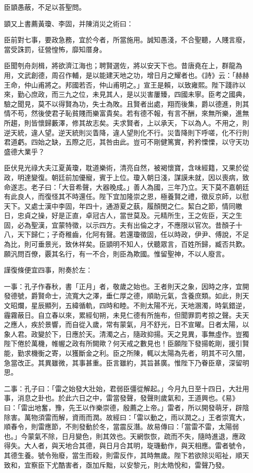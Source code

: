 \begin{pinyinscope}
臣顗愚蔽，不足以荅聖問。

顗又上書薦黃瓊、李固，并陳消災之術曰：

臣前對七事，要政急務，宜於今者，所當施用。誠知愚淺，不合聖聽，人賤言廢，當受誅罰，征營惶怖，靡知厝身。

臣聞刳舟剡楫，將欲濟江海也；聘賢選佐，將以安天下也。昔唐堯在上，群龍為用，文武創德，周召作輔，是以能建天地之功，增日月之耀者也。《詩》云：「赫赫王命，仲山甫將之。邦國若否，仲山甫明之。」宣王是賴，以致雍熙。陛下踐祚以來，勤心庶政，而三九之位，未見其人，是以災害屢臻，四國未寧。臣考之國典，驗之聞見，莫不以得賢為功，失士為敗。且賢者出處，翔而後集，爵以德進，則其情不苟，然後使君子恥貧賤而樂富貴矣。若有德不報，有言不酬，來無所樂，進無所趨，則皆懷歸藪澤，修其故志矣。夫求賢者，上以承天，下以為人。不用之，則逆天統，違人望。逆天統則災眚降，違人望則化不行。災眚降則下呼嗟，化不行則君道虧。四始之缺，五際之厄，其咎由此。豈可不剛健篤實，矜矜慄慄，以守天功盛德大業乎？

臣伏見光祿大夫江夏黃瓊，耽道樂術，清亮自然，被褐懷寶，含味經籍，又果於從政，明達變復。朝廷前加優寵，賓于上位。瓊入朝日淺，謀謨未就，因以喪病，致命遂志。老子曰：「大音希聲，大器晚成。」善人為國，三年乃立。天下莫不嘉朝廷有此良人，而復怪其不時還任。陛下宜加隆崇之恩，極養賢之禮，徵反京師，以慰天下。又處士漢中李固，年四十，通游夏之蓺，履顏閔之仁。絜白之節，情同皦日，忠貞之操，好是正直，卓冠古人，當世莫及。元精所生，王之佐臣，天之生固，必為聖漢，宜蒙特徵，以示四方。夫有出倫之才，不應限以官次。昔顏子十八，天下歸仁；子奇稚齒，化阿有聲。若還瓊徵固，任以時政，伊尹、傅說，不足為比，則可垂景光，致休祥矣。臣顗明不知人，伏聽眾言，百姓所歸，臧否共歎。願汎問百僚，覈其名行，有一不合，則臣為欺國。惟留聖神，不以人廢言。

謹復條便宜四事，附奏於左：

一事：孔子作春秋，書「正月」者，敬歲之始也。王者則天之象，因時之序，宜開發德號，爵賢命士，流寬大之澤，垂仁厚之德，順助元氣，含養庶類。如此，則天文昭爛，星辰顯列，五緯循軌，四時和睦。不則太陽不光，天地溷濁，時氣錯逆，霾霧蔽日。自立春以來，累經旬朔，未見仁德有所施布，但聞罪罰考掠之聲。夫天之應人，疾於景響，而自從入歲，常有蒙氣，月不舒光，日不宣曜。日者太陽，以象人君。政變於下，日應於天。清濁之占，隨政抑揚。天之見異，事無虛作。豈獨陛下倦於萬機，帷幄之政有所闕歟？何天戒之數見也！臣願陛下發揚乾剛，援引賢能，勤求機衡之寄，以獲斷金之利。臣之所陳，輒以太陽為先者，明其不可久闇，急當改正。其異雖微，其事甚重。臣言雖約，其旨甚廣。惟陛下乃眷臣章，深留明思。

二事：孔子曰：「雷之始發大壯始，君弱臣彊從解起。」今月九日至十四日，大壯用事，消息之卦也。於此六日之中，雷當發聲，發聲則歲氣和，王道興也。《易》曰：「雷出地奮，豫，先王以作樂崇德，殷薦之上帝。」雷者，所以開發萌牙，辟陰除害。萬物須雷而解，資雨而潤。故經曰：「雷以動之，雨以潤之。」王者崇寬大，順春令，則雷應節，不則發動於冬，當震反潛。故易傳曰：「當雷不雷，太陽弱也。」今蒙氣不除，日月變色，則其效也。天網恢恢，疏而不失，隨時進退，應政得失。大人者，與天地合其德，與日月合其明，琁璣動作，與天相應。雷者號令，其德生養。號令殆廢，當生而殺，則雷反作，其時無歲。陛下若欲除災昭祉，順天致和，宜察臣下尤酷害者，亟加斥黜，以安黎元，則太皓悅和，雷聲乃發。


\end{pinyinscope}
